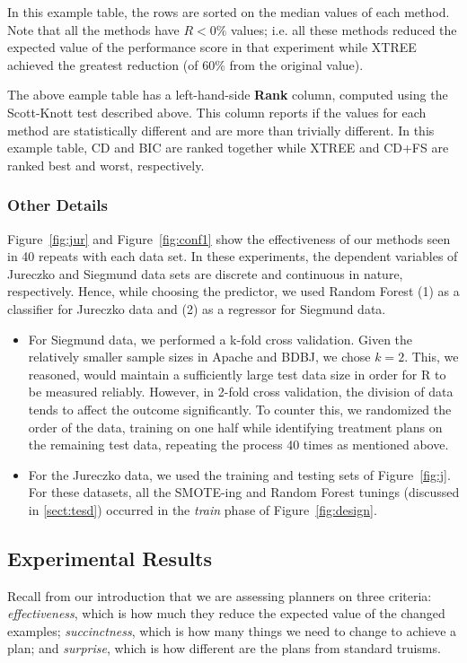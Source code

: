 \documentclass{sig-alternate}
\newcommand{\bi}{\begin{itemize}}
\newcommand{\ei}{\end{itemize}}
\newcommand{\tion}[1]{\textsection\ref{sect:#1}}
\newcommand{\fig}[1]{Figure~\ref{fig:#1}}
\begin{document}
In this example table, the rows are  sorted on the median values of each method. Note that all the methods
have   $R<0\%$ values; i.e. all these methods reduced the expected value of the performance score in that experiment
while XTREE achieved the greatest reduction (of 60\% from the original value).


The above eample table has a  left-hand-side  {\bf Rank} column, computed using the
Scott-Knott test described above. This column reports if
the values for each method are statistically different and are more than trivially different. 
In this example table, CD and BIC are ranked together while XTREE and CD+FS are ranked best and worst, respectively.
  
 

 
\subsubsection{Other Details}
 
\fig{jur} and \fig{conf1} show the effectiveness of our methods seen in 40 repeats with each data set.
In these experiments,   the dependent variables of Jureczko and Siegmund data sets are discrete and continuous in nature, respectively. Hence, while choosing the predictor, we used Random Forest (1) as a classifier for Jureczko data and (2) as a regressor for Siegmund data.
\bi
\item For Siegmund data, we performed a k-fold cross validation. Given the relatively smaller sample sizes in Apache and BDBJ, we chose $k=2$. This, we reasoned, would maintain a sufficiently large test data size in order for R to be measured reliably. However, in 2-fold cross validation, the division of data tends to affect the outcome significantly. To counter this, we randomized the order of the data, training on one half while identifying treatment plans on the remaining test data, repeating the process 40 times as mentioned above.
\item For the Jureczko data, we used the training and testing sets of \fig{j}. For these datasets,
 all the SMOTE-ing and Random Forest tunings (discussed in \tion{tesd})
occurred in the {\em train} phase of \fig{design}.
\ei
 \subsection{Experimental Results}

Recall from our introduction that we are assessing planners on three criteria:
{\em effectiveness}, which is how much they reduce the expected value of the changed examples;
{\em succinctness}, which is how many things we need to change to achieve a plan;
and {\em surprise}, which is how different are the plans from standard truisms.
\end{document}
